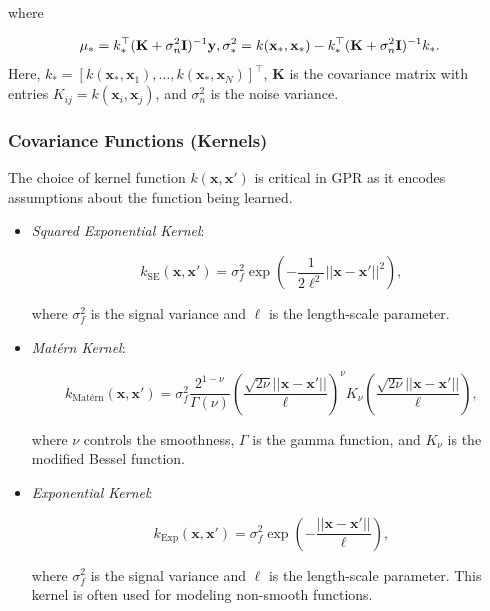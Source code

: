 where

\begin{equation}
    \mu_* = k_*^\top (\mathbf{K} + \sigma_n^2 \mathbf{I})^{-1} \mathbf{y}, \\
    \sigma_*^2 = k(\mathbf{x}_*, \mathbf{x}_*) - k_*^\top (\mathbf{K} + \sigma_n^2 \mathbf{I})^{-1} k_*.
\end{equation}
Here, $k_* = [k(\mathbf{x}_*, \mathbf{x}_1), \dots, k(\mathbf{x}_*, \mathbf{x}_N)]^\top$, $\mathbf{K}$ is the covariance matrix with entries $K_{ij} = k(\mathbf{x}_i, \mathbf{x}_j)$, and $\sigma_n^2$ is the noise variance.

\subsubsection{Covariance Functions (Kernels)}

The choice of kernel function $k(\mathbf{x}, \mathbf{x}')$ is critical in GPR as it encodes assumptions about the function being learned.


\begin{itemize}
    \item \textit{Squared Exponential Kernel}:

    \begin{equation}
        k_{\text{SE}}(\mathbf{x}, \mathbf{x}') = \sigma_f^2 \exp\left( -\frac{1}{2\ell^2} ||\mathbf{x} - \mathbf{x}'||^2 \right),
    \end{equation}

    where $\sigma_f^2$ is the signal variance and $\ell$ is the length-scale parameter.

    \item \textit{Matérn Kernel}:

    \begin{equation}
        k_{\text{Matérn}}(\mathbf{x}, \mathbf{x}') = \sigma_f^2 \frac{2^{1-\nu}}{\Gamma(\nu)} \left( \frac{\sqrt{2\nu}||\mathbf{x} - \mathbf{x}'||}{\ell} \right)^\nu K_\nu\left( \frac{\sqrt{2\nu}||\mathbf{x} - \mathbf{x}'||}{\ell} \right),
    \end{equation}

    where $\nu$ controls the smoothness, $\Gamma$ is the gamma function, and $K_\nu$ is the modified Bessel function.

    \item \textit{Exponential Kernel}:

    \begin{equation}
        k_{\text{Exp}}(\mathbf{x}, \mathbf{x}') = \sigma_f^2 \exp\left( -\frac{||\mathbf{x} - \mathbf{x}'||}{\ell} \right),
    \end{equation}

    where $\sigma_f^2$ is the signal variance and $\ell$ is the length-scale parameter. This kernel is often used for modeling non-smooth functions.
\end{itemize}


